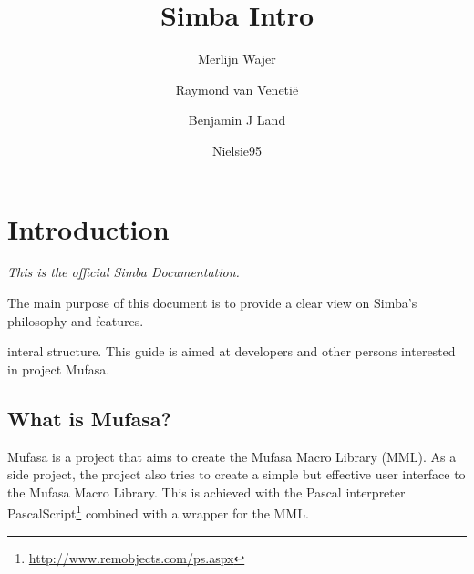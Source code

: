 \documentclass[a4paper, 10pt]{report} %
\begin{document}
\title{Simba Intro}
\author{Merlijn Wajer \and Raymond van Veneti\"{e} \and Benjamin J Land \and
Nielsie95}
\maketitle
\tableofcontents

\chapter{Introduction}

\emph{This is the official Simba Documentation.}

The main purpose of this document is to provide a clear view on Simba's 
philosophy and features.

interal structure. This guide is aimed at developers and other persons
interested in project Mufasa.

\section{What is Mufasa?}

Mufasa is a project that aims to create the Mufasa Macro Library (MML).
As a side project, the project also tries to create a simple but effective
user interface to the Mufasa Macro Library. This is achieved with the
Pascal interpreter PascalScript\footnote{
\url{http://www.remobjects.com/ps.aspx}} combined with a wrapper for the MML.
\end{document}
